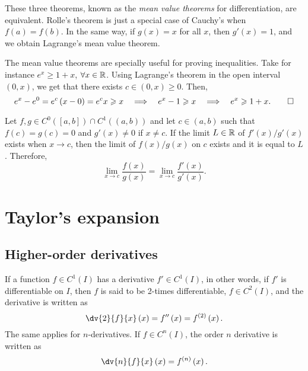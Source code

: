 These three theorems, known as the \textit{mean value theorems} for differentiation, are equivalent. Rolle's
theorem is just a special case of Cauchy's when $f\left( a \right) = f\left( b \right) $. In the same way,
if $g\left( x \right) = x$ for all $x$, then $g'\left( x \right) = 1$, and we obtain Lagrange's mean value theorem.

The mean value theorems are specially useful for proving inequalities. Take for instance $e^x\geq 1 + x$, $\forall x\in\R$. Using Lagrange's theorem in the open interval $\left( 0, x \right) $, we get that there exists
$c\in\left( 0, x \right) \geq 0$. Then,
\begin{equation}
    e^x - e^0 = e^c\left( x - 0 \right) = e^cx \geq x\quad\implies\quad e^x - 1\geq x\quad\implies\quad e^x\geq 1 + x.\qed
\end{equation}

\begin{theorem}
    Let $f, g\in C^0\left( [a, b] \right) \cap C^1\left(\left( a, b \right)\right) $ and let $c\in\left( a, b \right) $ such that $f\left( c \right) = g\left( c \right) = 0$ and $g'\left( x \right) \neq 0$ if $x\neq c$.
    If the limit $L\in\R$ of $f'\left( x \right)  / g'\left( x \right) $ exists when $x\to c$, then the
    limit of $f\left( x \right) / g\left( x \right) $ on $c$ exists and it is equal to $L$. Therefore,
    \begin{equation}
        \lim_{x\to c}\frac{f\left( x \right) }{g\left( x \right) } = \lim_{x\to c}\frac{f'\left( x \right) }{g'\left( x \right) }.
    \end{equation}
\end{theorem}

\section{Taylor's expansion}
\subsection{Higher-order derivatives}
If a function $f\in C^1\left( I \right) $ has a derivative $f'\in C^1\left( I \right) $, in other words, if
$f'$ is differentiable on $I$, then $f$ is said to be 2-times differentiable, $f\in C^2\left( I \right) $,
and the derivative is written as
\begin{equation}
    \dv{2}{f}{x}\left( x \right) = f''\left( x \right) = f^{\left( 2 \right) }\left( x \right).
\end{equation}
The same applies for $n$-derivatives. If $f\in C^n\left( I \right) $, the order $n$ derivative is written as
\begin{equation}
    \dv{n}{f}{x}\left( x \right) = f^{\left( n \right) }\left( x \right).
\end{equation}


